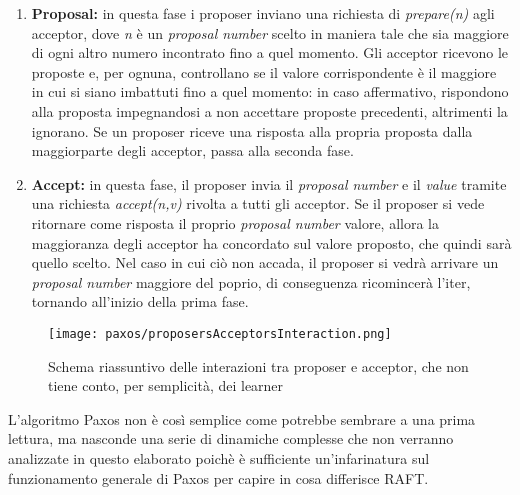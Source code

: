 \begin{enumerate}
	\item \textbf{Proposal:} in questa fase i proposer inviano una richiesta di \textit{prepare(n)} agli acceptor, dove \textit{n} è un \textit{proposal number} scelto in maniera tale che sia maggiore di ogni altro numero incontrato fino a quel momento. Gli acceptor ricevono le proposte e, per ognuna, controllano se il valore corrispondente è il maggiore in cui si siano imbattuti fino a quel momento: in caso affermativo, rispondono alla proposta impegnandosi a non accettare proposte precedenti, altrimenti la ignorano. Se un proposer riceve una risposta alla propria proposta dalla maggiorparte degli acceptor, passa alla seconda fase.
	
	\item \textbf{Accept:} in questa fase, il proposer invia il \textit{proposal number} e il \textit{value} tramite una richiesta \textit{accept(n,v)} rivolta a tutti gli acceptor. Se il proposer si vede ritornare come risposta il proprio \textit{proposal number} valore, allora la maggioranza degli acceptor ha concordato sul valore proposto, che quindi sarà quello scelto. Nel caso in cui ciò non accada, il proposer si vedrà arrivare un \textit{proposal number} maggiore del poprio, di conseguenza ricomincerà l'iter, tornando all'inizio della prima fase.
\end{enumerate}

  \begin{figure}[H]
    \centering
    \texttt{[image: paxos/proposersAcceptorsInteraction.png]}
    \caption{Schema riassuntivo delle interazioni tra proposer e acceptor, che non tiene conto, per semplicità, dei learner}
    \label{fig:figure 6}
  \end{figure}

L'algoritmo Paxos non è così semplice come potrebbe sembrare a una prima lettura, ma nasconde una serie di dinamiche complesse che non verranno analizzate in questo elaborato poichè è sufficiente un'infarinatura sul funzionamento generale di Paxos per capire in cosa differisce RAFT. 

